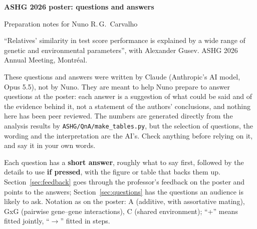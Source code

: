\documentclass[11pt]{article}
\makeatletter
\renewcommand\section{\@startsection{section}{1}{\z@}{-2.6ex \@plus -1ex \@minus -.2ex}{1.4ex \@plus .2ex}{\color{navy}\Large\bfseries}}
\makeatother
\begin{document}
\begin{center}
  {\color{navy}\LARGE\bfseries ASHG 2026 poster: questions and answers\par}
  \vspace{0.4em}
  {\large Preparation notes for Nuno R.\,G.\ Carvalho\par}
  \vspace{0.2em}
  {\small\color{gray!60!black} ``Relatives' similarity in test score performance is explained by a wide range of genetic and
  environmental parameters'', with Alexander Gusev. ASHG 2026 Annual Meeting, Montr\'eal.\par}
\end{center}

\begin{tcolorbox}[colback=salmon!8, colframe=salmon!80!black, boxrule=0.8pt, arc=2pt,
  title={\bfseries AI disclosure}, colbacktitle=salmon!80!black, coltitle=white]
These questions and answers were written by Claude (Anthropic's AI model, Opus 5.5), not by Nuno. They are
meant to help Nuno prepare to answer questions at the poster: each answer is a suggestion of what could be
said and of the evidence behind it, not a statement of the authors' conclusions, and nothing here has been
peer reviewed. The numbers are generated directly from the analysis results by
\texttt{ASHG/QnA/make\_tables.py}, but the selection of questions, the wording and the interpretation are the
AI's. Check anything before relying on it, and say it in your own words.
\end{tcolorbox}

\tableofcontents
\newpage

\section{How to use these notes}
Each question has a \textbf{short answer}, roughly what to say first, followed by the details to use
\textbf{if pressed}, with the figure or table that backs them up. Section~\ref{sec:feedback} goes through the
professor's feedback on the poster and points to the answers; Section~\ref{sec:questions} has the questions an
audience is likely to ask. Notation as on the poster: A (additive, with assortative mating), GxG (pairwise
gene--gene interactions), C (shared environment); ``+'' means fitted jointly, ``$\to$'' fitted in steps.
\end{document}
